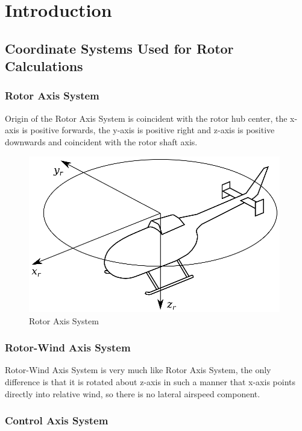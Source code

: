 \chapter{Introduction}

\section{Coordinate Systems Used for Rotor Calculations}

\subsection{Rotor Axis System}

Origin of the Rotor Axis System is coincident with the rotor hub center, the x-axis is positive forwards, the y-axis is positive right and z-axis is positive downwards and coincident with the rotor shaft axis.

\begin{figure}[h!]
  \centering
  \includegraphics[width=110mm]{images/coordinate_system_RAS.eps}
  \caption{Rotor Axis System}
\end{figure}

\subsection{Rotor-Wind Axis System}

Rotor-Wind Axis System is very much like Rotor Axis System, the only difference is that it is rotated about z-axis in such a manner that x-axis points directly into relative wind, so there is no lateral airspeed component.

\subsection{Control Axis System}

